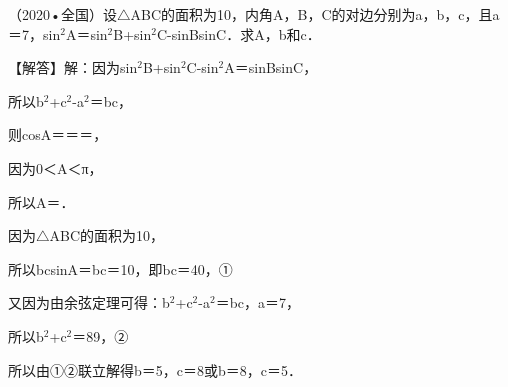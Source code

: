 \begin{question}
（2020•全国）设$\triangle$ABC的面积为10\allowbreak{}，内角A，B，C的对边分别为a，b，c，且a＝7，sin$^{2}$A＝sin$^{2}$B+sin$^{2}$C-sinBsinC．求A，b和c．\par
\begin{solution}
【解答】解：因为sin$^{2}$B+sin$^{2}$C-sin$^{2}$A＝sinBsinC，\par
所以b$^{2}$+c$^{2}$-a$^{2}$＝bc，\par
则cosA＝\allowbreak{}＝\allowbreak{}＝\allowbreak{}，\par
因为0＜A＜π，\par
所以A＝\allowbreak{}．\par
因为$\triangle$ABC的面积为10\allowbreak{}，\par
所以\allowbreak{}bcsinA＝\allowbreak{}bc＝10\allowbreak{}，即bc＝40，①\par
又因为由余弦定理可得：b$^{2}$+c$^{2}$-a$^{2}$＝bc，a＝7，\par
所以b$^{2}$+c$^{2}$＝89，②\par
所以由①②联立解得b＝5，c＝8或b＝8，c＝5．\par
\end{solution}
\end{question}

